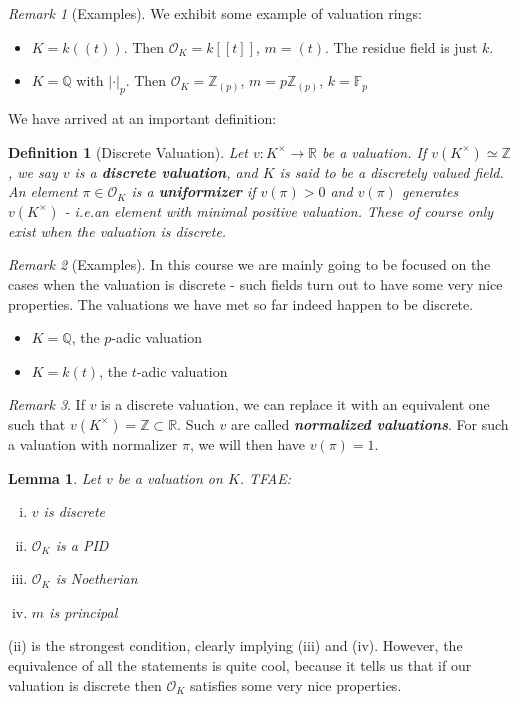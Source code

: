 \documentclass[]{article}
\theoremstyle{custhm}
\theoremstyle{cusdef}
\newtheorem{defin}[theorem]{Definition}
\theoremstyle{custhm}
\newtheorem{lemma}[theorem]{Lemma}
\theoremstyle{custhm}
\theoremstyle{custhm}
\theoremstyle{custhm}
\theoremstyle{cusdef}
\theoremstyle{remark}
\newtheorem*{remark*}{Remark}
\newcommand{\Z}{\mathbb{Z}}
\newcommand{\Q}{\mathbb{Q}}
\newcommand{\R}{\mathbb{R}}
\newcommand{\ra}{\rightarrow}
\newcommand{\ie}{\textit{i.e.}}
\newcommand{\undf}[1]{\textit{\textbf{#1}}}
\renewcommand{\O}{\mathcal{O}}
\begin{document}
\begin{remark*}[Examples]
We exhibit some example of valuation rings:
\begin{itemize}
	\item $K = k((t))$. Then $\O_K = k[[t]]$, $m = (t)$. The residue field is just $k$.
	\item $K = \Q$ with $|\cdot|_p$. Then $\O_K = \Z_{(p)}$, $m = p\Z_{(p)}$, $k = \mathbb{F}_p$
\end{itemize}
\end{remark*}

We have arrived at an important definition:

\begin{defin}[Discrete Valuation]
Let $v:K^\times \ra\R$ be a valuation. If $v(K^\times)\simeq \Z$, we say $v$ is a \undf{discrete valuation}, and $K$ is said to be a discretely valued field. An element $\pi \in \O_K$ is a \undf{uniformizer} if $v(\pi) > 0$ and $v(\pi)$ generates $v(K^\times)$ - \ie an element with minimal positive valuation. These of course only exist when the valuation is discrete.
\end{defin}
\begin{remark*}[Examples]
In this course we are mainly going to be focused on the cases when the valuation is discrete - such fields turn out to have some very nice properties. The valuations we have met so far indeed happen to be discrete.
\begin{itemize}
	\item $K = \Q$, the $p$-adic valuation
	\item $K = k(t)$, the $t$-adic valuation
\end{itemize}
\end{remark*}
\begin{remark*}
	If $v$ is a discrete valuation, we can replace it with an equivalent one such that $v(K^\times) = \Z\subset \R$. Such $v$ are called \undf{normalized valuations}. For such a valuation with normalizer $\pi$, we will then have $v(\pi) = 1$.
\end{remark*}

\begin{lemma}
	Let $v$ be a valuation on $K$. TFAE:
	\begin{enumerate}[(i)]
		\item $v$ is discrete
		\item $\O_K$ is a PID
		\item $\O_K$ is Noetherian
		\item $m$ is principal
	\end{enumerate}
\end{lemma}
(ii) is the strongest condition, clearly implying (iii) and (iv). However, the equivalence of all the statements is quite cool, because it tells us that if our valuation is discrete then $\O_K$ satisfies some very nice properties.
\end{document}

